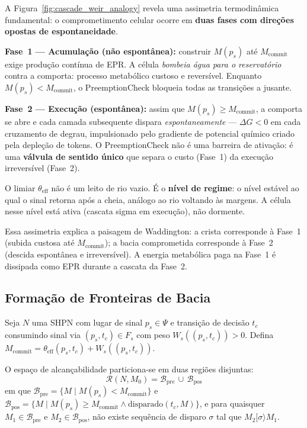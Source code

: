 \begin{remark}
\label{rem:assimetria-espontaneidade}
A Figura~\ref{fig:cascade_weir_analogy} revela uma assimetria termodinâmica
fundamental: o comprometimento celular ocorre em \textbf{duas fases com
direções opostas de espontaneidade}.

\textbf{Fase~1 --- Acumulação (não espontânea):} construir $M(p_s)$ até
$M_{\text{commit}}$ exige produção contínua de EPR.  A célula
\emph{bombeia água para o reservatório} contra a comporta: processo
metabólico custoso e reversível.  Enquanto $M(p_s) < M_{\text{commit}}$,
o PreemptionCheck bloqueia todas as transições a jusante.

\textbf{Fase~2 — Execução (espontânea):} assim que $M(p_s) \geq
M_{\text{commit}}$, a comporta se abre e cada camada subsequente dispara
\emph{espontaneamente} --- $\Delta G < 0$ em cada cruzamento de degrau,
impulsionado pelo gradiente de potencial químico criado pela depleção de
tokens.  O PreemptionCheck não é uma barreira de ativação: é uma
\textbf{válvula de sentido único} que separa o custo (Fase~1) da execução
irreversível (Fase~2).

O limiar $\theta_{\mathrm{eff}}$ não é um leito de rio vazio.
É o \textbf{nível de regime}: o nível estável
ao qual o sinal retorna após a cheia, análogo ao rio voltando às margens.
A célula nesse nível está ativa (cascata sigma em execução), não dormente.

Essa assimetria explica a paisagem de Waddington: a crista corresponde à
Fase~1 (subida custosa até $M_{\text{commit}}$); a bacia comprometida
corresponde à Fase~2 (descida espontânea e irreversível).  A energia
metabólica paga na Fase~1 é dissipada como EPR durante a cascata da Fase~2.
\end{remark}

\subsection{Formação de Fronteiras de Bacia}
\label{subsec:fronteiras-bacia}

\begin{theorem}
\label{thm:fronteiras-bacia}
Seja $N$ uma SHPN com lugar de sinal $p_s \in \Psi$ e transição de decisão
$t_c$ consumindo sinal via $(p_s, t_c) \in F_s$ com peso $W_s((p_s, t_c)) > 0$.
Defina $M_{\text{commit}} = \theta_{\mathrm{eff}}(p_s,t_c) + W_s((p_s, t_c))$.

O espaço de alcançabilidade particiona-se em duas regiões disjuntas:
\[
\mathcal{R}(N, M_0) = \mathcal{B}_{\text{pre}} \,\cup\, \mathcal{B}_{\text{pos}}
\]
em que $\mathcal{B}_{\text{pre}} = \{M \mid M(p_s) < M_{\text{commit}}\}$ e
$\mathcal{B}_{\text{pos}} = \{M \mid M(p_s) \geq M_{\text{commit}} \wedge
\text{disparado}(t_c, M)\}$, e para quaisquer $M_1 \in \mathcal{B}_{\text{pre}}$
e $M_2 \in \mathcal{B}_{\text{pos}}$, não existe sequência de disparo $\sigma$
tal que $M_2[\sigma\rangle M_1$.
\end{theorem}

